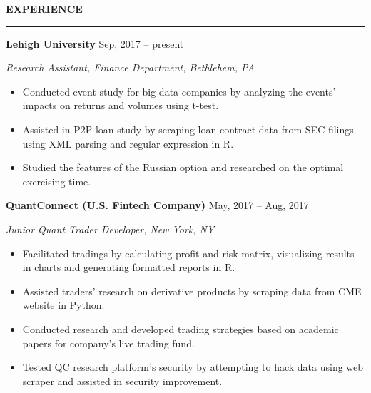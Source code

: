 \documentclass[a4paper,12pt]{report}
\newcommand{\marginAdj}{0.5in}
\begin{document}
\noindent 
\textbf{EXPERIENCE} \par
\vspace{2pt}
\hrule
\vspace{6pt}

\noindent 
\textbf{Lehigh University}{\fontsize{9pt}{9pt}\selectfont  \hspace*{4.3in} \hspace*{\marginAdj} {\fontsize{10pt}{10pt}\selectfont Sep, 2017 – present}} \par
\noindent 
{\fontsize{10pt}{10pt}\selectfont \textit{Research Assistant, Finance Department, Bethlehem, PA}} \par
\noindent 
\begin{itemize}[noitemsep,topsep=0pt]
	\item {\fontsize{10pt}{10pt}\selectfont Conducted event study for big data companies by analyzing the events' impacts on returns and volumes using t-test.} \par
	\noindent 
	\item {\fontsize{10pt}{10pt}\selectfont Assisted in P2P loan study by scraping loan contract data from SEC filings using XML parsing and regular expression in R.} \par
	\noindent 
	\item {\fontsize{10pt}{10pt}\selectfont Studied the features of the Russian option and researched on the optimal exercising time.} \par
\end{itemize}

\noindent 
\textbf{QuantConnect (U.S. Fintech Company)}{\fontsize{9pt}{9pt}\selectfont  \hspace*{2.65in} \hspace*{\marginAdj}  {\fontsize{10pt}{10pt}\selectfont May, 2017 – Aug, 2017}} \par
\noindent 
{\fontsize{10pt}{10pt}\selectfont \textit{Junior Quant Trader Developer}\textit{, }\textit{New York}\textit{, NY}} \par
\noindent 
\begin{itemize}[noitemsep,topsep=0pt]
\item {\fontsize{10pt}{10pt}\selectfont Facilitated tradings by calculating profit and risk matrix, visualizing results in charts and generating formatted reports in R.} \par
\noindent 
\item {\fontsize{10pt}{10pt}\selectfont Assisted traders' research on derivative products by scraping data from CME website in Python. } \par
\noindent 
\item {\fontsize{10pt}{10pt}\selectfont Conducted research and developed trading strategies based on academic papers for company’s live trading fund.} \par
\item {\fontsize{10pt}{10pt}\selectfont Tested QC research platform's security by attempting to hack data using web scraper and assisted in security improvement.} \par
\noindent 
\end{itemize}
\end{document}
